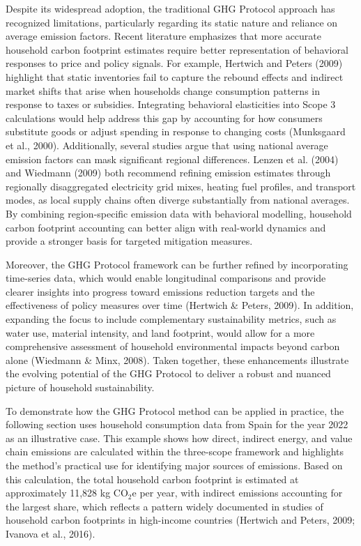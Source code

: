 \documentclass[12pt,a4paper]{article}%
\begin{document}
Despite its widespread adoption, the traditional GHG Protocol approach has recognized limitations, particularly regarding its static nature and reliance on average emission factors. Recent literature emphasizes that more accurate household carbon footprint estimates require better representation of behavioral responses to price and policy signals. For example, Hertwich and Peters (2009) highlight that static inventories fail to capture the rebound effects and indirect market shifts that arise when households change consumption patterns in response to taxes or subsidies. Integrating behavioral elasticities into Scope 3 calculations would help address this gap by accounting for how consumers substitute goods or adjust spending in response to changing costs (Munksgaard et al., 2000). Additionally, several studies argue that using national average emission factors can mask significant regional differences. Lenzen et al. (2004) and Wiedmann (2009) both recommend refining emission estimates through regionally disaggregated electricity grid mixes, heating fuel profiles, and transport modes, as local supply chains often diverge substantially from national averages. By combining region-specific emission data with behavioral modelling, household carbon footprint accounting can better align with real-world dynamics and provide a stronger basis for targeted mitigation measures.

Moreover, the GHG Protocol framework can be further refined by incorporating time-series data, which would enable longitudinal comparisons and provide clearer insights into progress toward emissions reduction targets and the effectiveness of policy measures over time (Hertwich \& Peters, 2009). In addition, expanding the focus to include complementary sustainability metrics, such as water use, material intensity, and land footprint, would allow for a more comprehensive assessment of household environmental impacts beyond carbon alone (Wiedmann \& Minx, 2008). Taken together, these enhancements illustrate the evolving potential of the GHG Protocol to deliver a robust and nuanced picture of household sustainability.

To demonstrate how the GHG Protocol method can be applied in practice, the following section uses household consumption data from Spain for the year 2022 as an illustrative case. This example shows how direct, indirect energy, and value chain emissions are calculated within the three-scope framework and highlights the method’s practical use for identifying major sources of emissions.
Based on this calculation, the total household carbon footprint is estimated at approximately 11,828 kg CO$_2$e per year, with indirect emissions accounting for the largest share, which reflects a pattern widely documented in studies of household carbon footprints in high-income countries (Hertwich and Peters, 2009; Ivanova et al., 2016).
\end{document}
